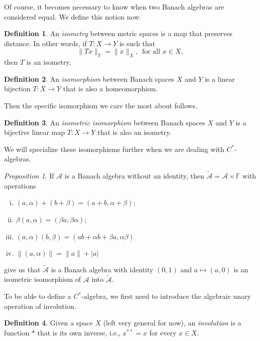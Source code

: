 \documentclass[leqno]{article}
\theoremstyle{definition}
\newtheorem{definition}{Definition}[section]
\theoremstyle{remark}
\theoremstyle{theorem}
\newtheorem{proposition}{Proposition}
\newcommand{\F}{\mathbb{F}}
\newcommand{\A}{\mathcal{A}}
\begin{document}
Of course, it becomes necessary to know when two Banach algebras are considered equal.  We define this notion now. 

\begin{definition}
An \emph{isometry} between metric spaces is a map that preserves distance. In other words, if $T\colon X\to Y$ is such that
\[
\|Tx\|_Y = \|x\|_X, ~~  \textrm{for all $x\in X$},
\]
then $T$ is an isometry.
\end{definition}

\begin{definition}
An \emph{isomorphism} between Banach spaces $X$ and $Y$ is a linear bijection $T\colon X\to Y$ that is also a homeomorphism.
\end{definition}

\noindent Then the specific isomorphism we care the most about follows.

\begin{definition}
An \emph{isometric isomorphism} between Banach spaces $X$ and $Y$ is a bijective linear map $T\colon X \to Y$ that is also an isometry.
\end{definition}

\noindent We will specialize these isomorphisms further when we are dealing with $C^*$-algebras.

\begin{proposition}
If $\A$ is a Banach algebra without an identity, then $\tilde{\A}=\A\times \F$ with operations
\begin{enumerate}[(i)]
\item $(a,\alpha)+(b+\beta)=(a+b,\alpha+\beta)$;
\item $\beta(a,\alpha)=(\beta a,\beta \alpha)$;
\item $(a,\alpha)(b,\beta)=(ab+\alpha b+\beta a,\alpha \beta)$
\item $\|(a,\alpha)\|=\|a\|+|a|$
\end{enumerate}
give us that $\tilde{\A}$ is a Banach algebra with identity $(0,1)$ and $a\mapsto (a,0)$ is an isometric isomorphism of $\A$ into $\tilde{\A}$.
\end{proposition}

\noindent To be able to define a $C^*$-algebra, we first need to introduce the algebraic unary operation of involution.

\begin{definition}
Given a space $X$ (left very general for now), an \emph{involution} is a function $*$ that is its own inverse, i.e., $x^{**}=x$ for every $x\in X$.
\end{definition}
\end{document}

